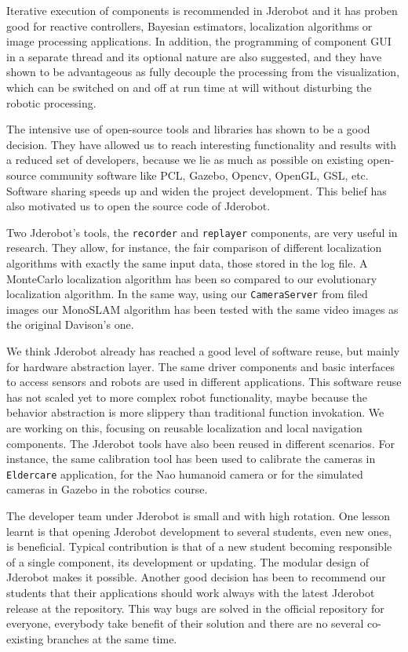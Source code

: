 \documentclass[twocolumn]{svjour3}          %
\begin{document}
Iterative execution of components is recommended in Jderobot and it has proben good for reactive controllers, Bayesian estimators, localization algorithms or image processing applications. In addition, the programming of component GUI in a separate thread and its optional nature are also suggested, and they have shown to be advantageous as fully decouple the processing from the visualization, which can be switched on and off at run time at will without disturbing the robotic processing.

The intensive use of open-source tools and libraries has shown to be a good decision. They have allowed us to reach interesting functionality and results with a reduced set of developers, because we lie as much as possible on existing open-source community software like PCL, Gazebo, Opencv, OpenGL, GSL, etc. Software sharing speeds up and widen the project development. This belief has also motivated us to open the source code of Jderobot.

Two Jderobot's tools, the \texttt{recorder} and \texttt{replayer} components, are very useful in research. They allow, for instance, the fair comparison of different localization algorithms with exactly the same input data, those stored in the log file. A MonteCarlo localization algorithm has been so compared to our evolutionary localization algorithm. In the same way, using our \texttt{CameraServer} from filed images our MonoSLAM algorithm has been tested with the same video images as the original Davison's one.

We think Jderobot already has reached a good level of software reuse, but mainly for hardware abstraction layer. The same driver components and basic interfaces to access sensors and robots are used in different applications. This software reuse has not scaled yet to more complex robot functionality, maybe because the behavior abstraction is more slippery than traditional function invokation. We are working on this, focusing on reusable localization and local navigation components. The Jderobot tools have also been reused in different scenarios. For instance, the same calibration tool has been used to calibrate the cameras in \texttt{Eldercare} application, for the Nao humanoid camera or for the simulated cameras in Gazebo in the robotics course.

The developer team under Jderobot is small and with high rotation. One lesson learnt is that opening Jderobot development to several students, even new ones, is beneficial. Typical contribution is that of a new student becoming responsible of a single component, its development or updating. The modular design of Jderobot makes it possible. Another good decision has been to recommend our students that their applications should work always with the latest Jderobot release at the repository. This way bugs are solved in the official repository for everyone, everybody take benefit of their solution and there are no several co-existing branches at the same time.
\end{document}
